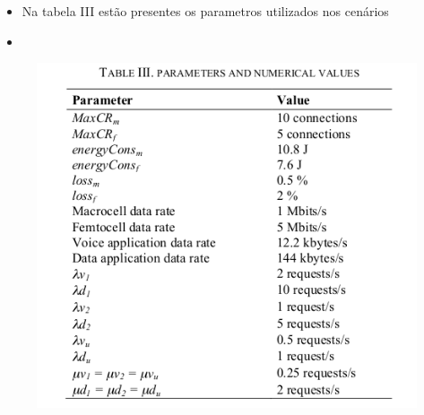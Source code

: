 \begin{frame}
  \begin{block}
    \begin{itemize}
      \item Na tabela III estão presentes os parametros utilizados nos cenários
      \item 
    \end{itemize}
  \end{block}
  \begin{figure}
    \includegraphics [scale=1.4]{./Figures/table3}
  \end{figure}
\end{frame}



